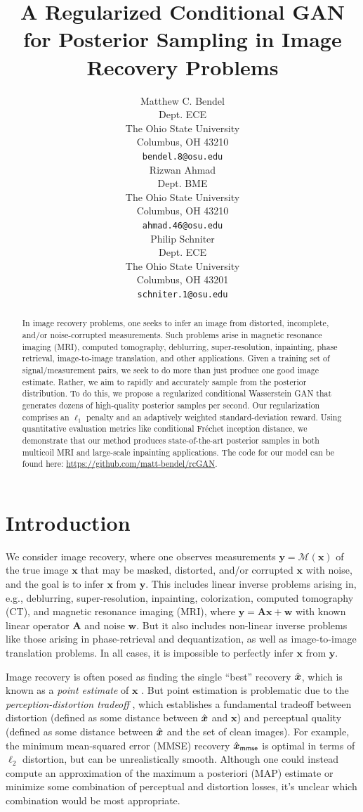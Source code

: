 \documentclass{article}
\title{A Regularized Conditional GAN for Posterior Sampling in Image Recovery Problems}
\author{%
  Matthew C. Bendel \\
  Dept. ECE\\
  The Ohio State University\\
  Columbus, OH 43210 \\
  \texttt{bendel.8@osu.edu} \\
  \And
  Rizwan Ahmad \\
  Dept. BME\\
  The Ohio State University\\
  Columbus, OH 43210 \\
  \texttt{ahmad.46@osu.edu} \\
  \And
  Philip Schniter \\
  Dept. ECE\\
  The Ohio State University\\
  Columbus, OH 43201 \\
  \texttt{schniter.1@osu.edu} \\
}
\theoremstyle{plain}
\theoremstyle{definition}
\theoremstyle{remark}
\newcommand{\hvec}[1]{\ensuremath{\Hat{\boldsymbol{#1}}}}
\renewcommand{\vec}[1]{\ensuremath{\boldsymbol{#1}}}
\newcommand{\mc}[1]{\ensuremath{\mathcal{#1}}}
\newcommand{\mmse}{_{\mathsf{mmse}}}
\begin{document}
\maketitle


\begin{abstract}
In image recovery problems, one seeks to infer an image from distorted, incomplete, and/or noise-corrupted measurements.
Such problems arise in magnetic resonance imaging (MRI), computed tomography, deblurring, super-resolution, inpainting, phase retrieval, image-to-image translation, and other applications.
Given a training set of signal/measurement pairs, we seek to do more than just produce one good image estimate.  
Rather, we aim to rapidly and accurately sample from the posterior distribution.  To do this,
we propose a regularized conditional Wasserstein GAN that generates dozens of high-quality posterior samples per second.  
Our regularization comprises an $\ell_1$ penalty and an adaptively weighted standard-deviation reward.
Using quantitative evaluation metrics like conditional Fr\'{e}chet inception distance, we demonstrate that our method produces state-of-the-art posterior samples in both multicoil MRI and large-scale inpainting applications.
The code for our model can be found here: \url{https://github.com/matt-bendel/rcGAN}.
\end{abstract}

\section{Introduction} \label{sec:intro}
We consider image recovery, where one observes measurements $\vec{y}=\mc{M}(\vec{x})$ of the true image $\vec{x}$ that may be masked, distorted, and/or corrupted $\vec{x}$ with noise, and the goal is to infer $\vec{x}$ from $\vec{y}$. 
This includes linear inverse problems arising in, e.g., deblurring, super-resolution, inpainting, colorization, computed tomography (CT), and magnetic resonance imaging (MRI), where $\vec{y}=\vec{Ax}+\vec{w}$ with known linear operator $\vec{A}$ and noise $\vec{w}$.
But it also includes non-linear inverse problems like those arising in phase-retrieval and dequantization, as well as image-to-image translation problems.
In all cases, it is impossible to perfectly infer $\vec{x}$ from $\vec{y}$.

Image recovery is often posed as finding the single ``best'' recovery $\hvec{x}$, which is known as a \emph{point estimate} of $\vec{x}$ \cite{Lehmann:Book:06}.
But point estimation is problematic due to the \emph{perception-distortion tradeoff} \cite{Blau:CVPR:18}, which establishes a fundamental tradeoff between distortion (defined as some distance between $\hvec{x}$ and $\vec{x}$) and perceptual quality (defined as some distance between $\hvec{x}$ and the set of clean images).
For example, the minimum mean-squared error (MMSE) recovery $\hvec{x}\mmse$ is optimal in terms of $\ell_2$ distortion, but can be unrealistically smooth.
Although one could instead compute an approximation of the maximum a posteriori (MAP) estimate \cite{Sonderby:ICLR:17} or minimize some combination of perceptual and distortion losses,
it's unclear which combination would be most appropriate.
\end{document}
